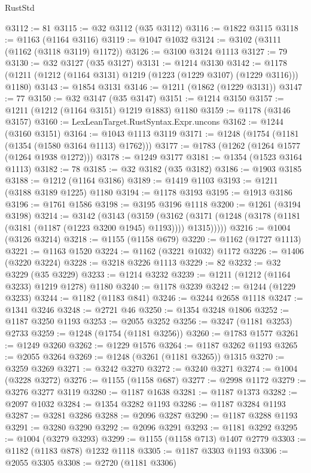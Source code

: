 \begin{lexlean}{RustStd}
\begin{coremodule}
{\begin{coremodule}
{{{{{{{{{{{{{{{{{{{{{{{{{{{{{{{{@3112 := 81
@3115 := @32 @3112 (@35 @3112)
@3116 := @1822 @3115
@3118 := @1163 (@1164 @3116)
@3119 := @1047 @1032
@3124 := @3102 (@3111 (@1162 (@3118 @3119) @1172))
@3126 := @3100 @3124 @1113
@3127 := 79
@3130 := @32 @3127 (@35 @3127)
@3131 := @1214 @3130
@3142 := @1178 (@1211 (@1212 (@1164 @3131) @1219 (@1223 (@1229 @3107) (@1229 @3116))) @1180)
@3143 := @1854 @3131
@3146 := @1211 (@1862 (@1229 @3131))
@3147 := 77
@3150 := @32 @3147 (@35 @3147)
@3151 := @1214 @3150
@3157 := @1211 (@1212 (@1164 @3151) @1219 @1883) @1180
@3159 := @1178 (@3146 @3157)
@3160 := LexLeanTarget.RustSyntax.Expr.uncons
@3162 := @1244 (@3160 @3151)
@3164 := @1043 @1113 @3119
@3171 := @1248 (@1754 (@1181 (@1354 (@1580 @3164 @1113) @1762)))
@3177 := @1783 (@1262 (@1264 @1577 (@1264 @1938 @1272)))
@3178 := @1249 @3177
@3181 := @1354 (@1523 @3164 @1113)
@3182 := 78
@3185 := @32 @3182 (@35 @3182)
@3186 := @1903 @3185
@3188 := @1212 (@1164 @3186)
@3189 := @1419 @1103
@3193 := @1211 (@3188 @3189 @1225) @1180
@3194 := @1178 @3193
@3195 := @1913 @3186
@3196 := @1761 @1586
@3198 := @3195 @3196 @1118
@3200 := @1261 (@3194 @3198)
@3214 := @3142
    (@3143
      (@3159
        (@3162 (@3171 (@1248 (@3178 (@1181 (@3181 (@1187 (@1223 @3200 @1945) @1193)))) @1315)))))
@3216 := @1004 (@3126 @3214)
@3218 := @1155 (@1158 @679)
@3220 := @1162 (@1727 @1113)
@3221 := @1163 @1520
@3224 := @1162 (@3221 @1032) @1172
@3226 := @1406 (@3220 @3224)
@3228 := @3218 @3226 @1113
@3229 := 82
@3232 := @32 @3229 (@35 @3229)
@3233 := @1214 @3232
@3239 := @1211 (@1212 (@1164 @3233) @1219 @1278) @1180
@3240 := @1178 @3239
@3242 := @1244 (@1229 @3233)
@3244 := @1182 (@1183 @841)
@3246 := @3244 @2658 @1118
@3247 := @1341 @3246
@3248 := @2721 @46
@3250 := @1354 @3248 @1806
@3252 := @1187 @3250 @1193
@3253 := @2055 @3252
@3256 := @3247 (@1181 @3253) @2733
@3259 := @1248 (@1754 (@1181 @3256))
@3260 := @1783 @1577
@3261 := @1249 @3260
@3262 := @1229 @1576
@3264 := @1187 @3262 @1193
@3265 := @2055 @3264
@3269 := @1248 (@3261 (@1181 @3265)) @1315
@3270 := @3259 @3269
@3271 := @3242 @3270
@3272 := @3240 @3271
@3274 := @1004 (@3228 @3272)
@3276 := @1155 (@1158 @687)
@3277 := @2998 @1172
@3279 := @3276 @3277 @3119
@3280 := @1187 @1638
@3281 := @1187 @1373
@3282 := @2097 @1032
@3284 := @1354 @3282 @1193
@3286 := @1187 @3284 @1193
@3287 := @3281 @3286
@3288 := @2096 @3287
@3290 := @1187 @3288 @1193
@3291 := @3280 @3290
@3292 := @2096 @3291
@3293 := @1181 @3292
@3295 := @1004 (@3279 @3293)
@3299 := @1155 (@1158 @713) @1407 @2779
@3303 := @1182 (@1183 @878) @1232 @1118
@3305 := @1187 @3303 @1193
@3306 := @2055 @3305
@3308 := @2720 (@1181 @3306)
}}}}}}}}}}}}}}}}}}}}}}}}}}}}}}}}
\end{coremodule}}
\end{coremodule}
\end{lexlean}
